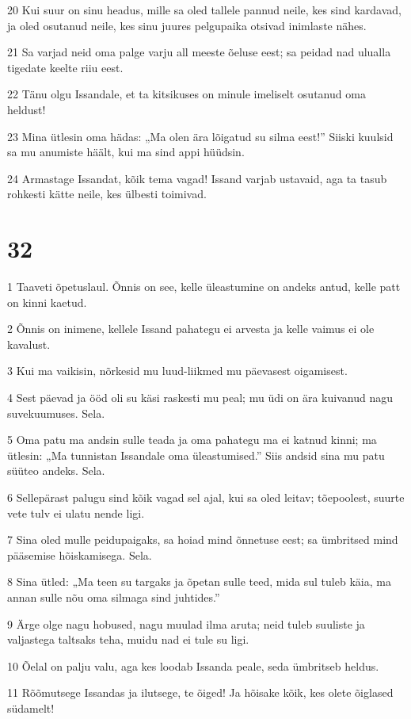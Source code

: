 \par 20 Kui suur on sinu headus, mille sa oled tallele pannud neile, kes sind kardavad, ja oled osutanud neile, kes sinu juures pelgupaika otsivad inimlaste nähes.
\par 21 Sa varjad neid oma palge varju all meeste õeluse eest; sa peidad nad ulualla tigedate keelte riiu eest.
\par 22 Tänu olgu Issandale, et ta kitsikuses on minule imeliselt osutanud oma heldust!
\par 23 Mina ütlesin oma hädas: „Ma olen ära lõigatud su silma eest!” Siiski kuulsid sa mu anumiste häält, kui ma sind appi hüüdsin.
\par 24 Armastage Issandat, kõik tema vagad! Issand varjab ustavaid, aga ta tasub rohkesti kätte neile, kes ülbesti toimivad.

\chapter{32}

\par 1 Taaveti õpetuslaul. Õnnis on see, kelle üleastumine on andeks antud, kelle patt on kinni kaetud.
\par 2 Õnnis on inimene, kellele Issand pahategu ei arvesta ja kelle vaimus ei ole kavalust.
\par 3 Kui ma vaikisin, nõrkesid mu luud-liikmed mu päevasest oigamisest.
\par 4 Sest päevad ja ööd oli su käsi raskesti mu peal; mu üdi on ära kuivanud nagu suvekuumuses. Sela.
\par 5 Oma patu ma andsin sulle teada ja oma pahategu ma ei katnud kinni; ma ütlesin: „Ma tunnistan Issandale oma üleastumised.” Siis andsid sina mu patu süüteo andeks. Sela.
\par 6 Sellepärast palugu sind kõik vagad sel ajal, kui sa oled leitav; tõepoolest, suurte vete tulv ei ulatu nende ligi.
\par 7 Sina oled mulle peidupaigaks, sa hoiad mind õnnetuse eest; sa ümbritsed mind pääsemise hõiskamisega. Sela.
\par 8 Sina ütled: „Ma teen su targaks ja õpetan sulle teed, mida sul tuleb käia, ma annan sulle nõu oma silmaga sind juhtides.”
\par 9 Ärge olge nagu hobused, nagu muulad ilma aruta; neid tuleb suuliste ja valjastega taltsaks teha, muidu nad ei tule su ligi.
\par 10 Õelal on palju valu, aga kes loodab Issanda peale, seda ümbritseb heldus.
\par 11 Rõõmutsege Issandas ja ilutsege, te õiged! Ja hõisake kõik, kes olete õiglased südamelt!

